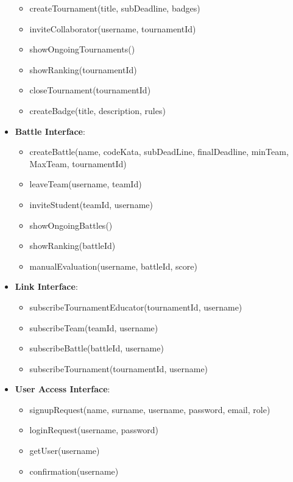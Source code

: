 \begin{itemize}
        \begin{itemize}
            \item createTournament(title, subDeadline, badges)
            \item inviteCollaborator(username, tournamentId)
            \item showOngoingTournaments()
            \item showRanking(tournamentId)
            \item closeTournament(tournamentId)
            \item createBadge(title, description, rules)
        \end{itemize}
    \item\textbf{Battle Interface}:
        \begin{itemize}
            \item createBattle(name, codeKata, subDeadLine, finalDeadline, minTeam, MaxTeam, tournamentId)
            \item leaveTeam(username, teamId)
            \item inviteStudent(teamId, username)
            \item showOngoingBattles()
            \item showRanking(battleId)
            \item manualEvaluation(username, battleId, score)
        \end{itemize}
    \item\textbf{Link Interface}:
        \begin{itemize}
            \item subscribeTournamentEducator(tournamentId, username)
            \item subscribeTeam(teamId, username)
            \item subscribeBattle(battleId, username)
            \item subscribeTournament(tournamentId, username)     
    \end{itemize}
    \item\textbf{User Access Interface}:
        \begin{itemize}
            \item signupRequest(name, surname, username, password, email, role)
            \item loginRequest(username, password)
            \item getUser(username)
            \item confirmation(username)
        \end{itemize}

\end{itemize}
